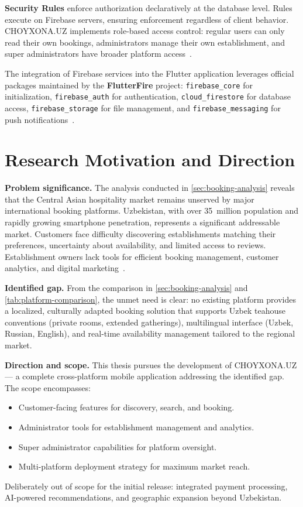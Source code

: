 \textbf{Security Rules} enforce authorization declaratively at the database level.
Rules execute on Firebase servers, ensuring enforcement regardless of client behavior.
CHOYXONA.UZ implements role-based access control: regular users can only read their own bookings, administrators manage their own establishment, and super administrators have broader platform access~\cite{firebase_firestore2024}.

The integration of Firebase services into the Flutter application leverages official packages maintained by the \textbf{FlutterFire} project: \texttt{firebase\_core} for initialization, \texttt{firebase\_auth} for authentication, \texttt{cloud\_firestore} for database access, \texttt{firebase\_storage} for file management, and \texttt{firebase\_messaging} for push notifications~\cite{firebase_auth2024}.


\section{Research Motivation and Direction}
\label{sec:motivation}

\textbf{Problem significance.}
The analysis conducted in \cref{sec:booking-analysis} reveals that the Central Asian hospitality market remains unserved by major international booking platforms.
Uzbekistan, with over 35~million population and rapidly growing smartphone penetration, represents a significant addressable market.
Customers face difficulty discovering establishments matching their preferences, uncertainty about availability, and limited access to reviews.
Establishment owners lack tools for efficient booking management, customer analytics, and digital marketing~\cite{gartner2023}.

\textbf{Identified gap.}
From the comparison in \cref{sec:booking-analysis} and \cref{tab:platform-comparison}, the unmet need is clear: no existing platform provides a localized, culturally adapted booking solution that supports Uzbek teahouse conventions (private rooms, extended gatherings), multilingual interface (Uzbek, Russian, English), and real-time availability management tailored to the regional market.

\textbf{Direction and scope.}
This thesis pursues the development of CHOYXONA.UZ --- a complete cross-platform mobile application addressing the identified gap.
The scope encompasses:
\begin{itemize}
  \item Customer-facing features for discovery, search, and booking.
  \item Administrator tools for establishment management and analytics.
  \item Super administrator capabilities for platform oversight.
  \item Multi-platform deployment strategy for maximum market reach.
\end{itemize}
Deliberately out of scope for the initial release: integrated payment processing, AI-powered recommendations, and geographic expansion beyond Uzbekistan.

